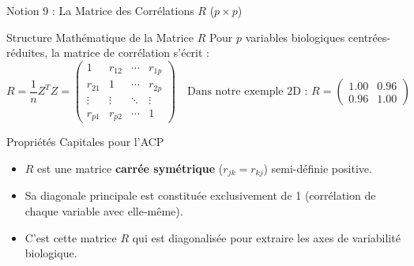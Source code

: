 \documentclass[aspectratio=169,10pt]{beamer}
\begin{document}
\begin{frame}{Notion 9 : La Matrice des Corrélations $R$ ($p \times p$)}
  \begin{conceptbox}{Structure Mathématique de la Matrice $R$}
    \footnotesize
    Pour $p$ variables biologiques centrées-réduites, la matrice de corrélation s'écrit :
    \begin{equation*}
      R = \frac{1}{n} Z^T Z = \begin{pmatrix} 1 & r_{12} & \cdots & r_{1p} \\ r_{21} & 1 & \cdots & r_{2p} \\ \vdots & \vdots & \ddots & \vdots \\ r_{p1} & r_{p2} & \cdots & 1 \end{pmatrix} \quad \text{Dans notre exemple 2D : } R = \begin{pmatrix} 1.00 & 0.96 \\ 0.96 & 1.00 \end{pmatrix}
    \end{equation*}
  \end{conceptbox}
  \vspace{1mm}
  \begin{biobox}{Propriétés Capitales pour l'ACP}
    \footnotesize
    \begin{itemize}
      \item $R$ est une matrice \textbf{carrée symétrique} ($r_{jk} = r_{kj}$) semi-définie positive.
      \item Sa diagonale principale est constituée exclusivement de 1 (corrélation de chaque variable avec elle-même).
      \item C'est cette matrice $R$ qui est diagonalisée pour extraire les axes de variabilité biologique.
    \end{itemize}
  \end{biobox}
\end{frame}
\end{document}
